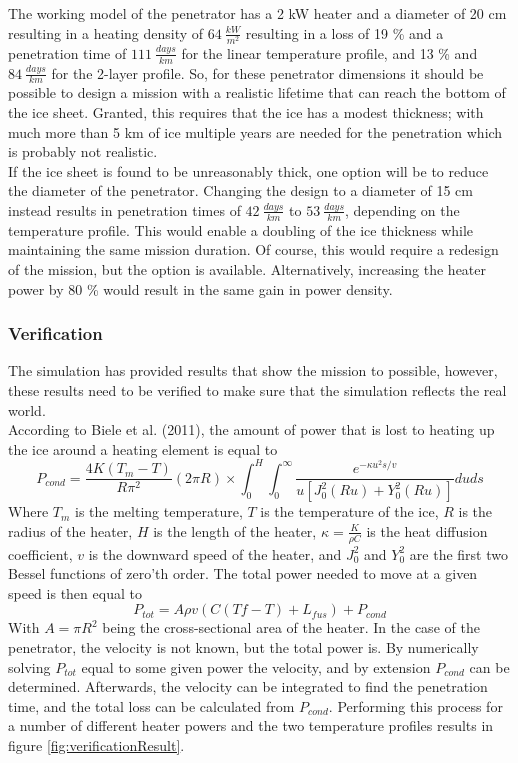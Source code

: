 \noindent
The working model of the penetrator has a 2 kW heater and a diameter of 20 cm resulting in a heating density of $\SI{64}{\frac{kW}{m^2}}$ resulting in a loss of 19 \% and a penetration time of $\SI{111}{\frac{days}{km}}$ for the linear temperature profile, and 13 \% and $\SI{84}{\frac{days}{km}}$ for the 2-layer profile. So, for these penetrator dimensions it should be possible to design a mission with a realistic lifetime that can reach the bottom of the ice sheet. Granted, this requires that the ice has a modest thickness; with much more than 5 km of ice multiple years are needed for the penetration which is probably not realistic.\\

\noindent
If the ice sheet is found to be unreasonably thick, one option will be to reduce the diameter of the penetrator. Changing the design to a diameter of 15 cm instead results in penetration times of $\SI{42}{\frac{days}{km}}$ to $\SI{53}{\frac{days}{km}}$, depending on the temperature profile. This would enable a doubling of the ice thickness while maintaining the same mission duration. Of course, this would require a redesign of the mission, but the option is available. Alternatively, increasing the heater power by 80 \% would result in the same gain in power density. 

\subsubsection{Verification}
The simulation has provided results that show the mission to possible, however, these results need to be verified to make sure that the simulation reflects the real world.\\

\noindent
According to Biele et al. (2011)\cite{article:biele2011a}, the amount of power that is lost to heating up the ice around a heating element is equal to
\begin{equation}
P_{cond}=\frac{4 K (T_m-T) }{R\pi^2}(2\pi R)\times \int_{0}^{H}\int_{0}^{\infty}\frac{
e^{-\kappa u^2 s/v}
}{
u\left[J_0^2(R u) + Y_0^2(R u)\right]
}duds
\end{equation}
Where $T_m$ is the melting temperature, $T$ is the temperature of the ice, $R$ is the radius of the heater, $H$ is the length of the heater, $\kappa=\frac{K}{\rho C}$ is the heat diffusion coefficient, $v$ is the downward speed of the heater, and $J_0^2$ and $Y_0^2$ are the first two Bessel functions of zero'th order. The total power needed to move at a given speed is then equal to
\begin{equation}
P_{tot} = A\rho v(C(Tf-T) + L_{fus}) + P_{cond}
\end{equation} 
With $A=\pi R^2$ being the cross-sectional area of the heater. In the case of the penetrator, the velocity is not known, but the total power is. By numerically solving $P_{tot}$ equal to some given power the velocity, and by extension $P_{cond}$ can be determined. Afterwards, the velocity can be integrated to find the penetration time, and the total loss can be calculated from $P_{cond}$. Performing this process for a number of different heater powers and the two temperature profiles results in figure \ref{fig:verificationResult}.

